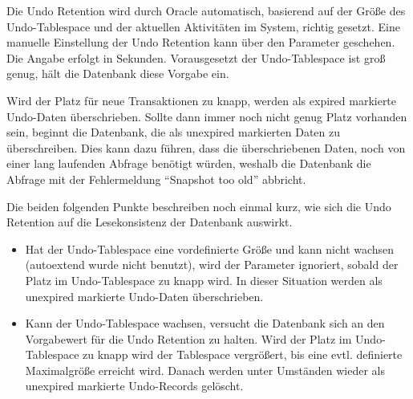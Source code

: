       Die Undo Retention wird durch Oracle automatisch, basierend auf der Größe des Undo-Tablespace und der aktuellen Aktivitäten im System, richtig gesetzt. Eine manuelle Einstellung der Undo Retention kann über den Parameter  geschehen. Die Angabe erfolgt in Sekunden. Vorausgesetzt der Undo-Tablespace ist groß genug, hält die Datenbank diese Vorgabe ein.

      Wird der Platz für neue Transaktionen zu knapp, werden als expired markierte Undo-Daten überschrieben. Sollte dann immer noch nicht genug Platz vorhanden sein, beginnt die Datenbank, die als unexpired markierten Daten zu überschreiben. Dies kann dazu führen, dass die überschriebenen Daten, noch von einer lang laufenden Abfrage benötigt würden, weshalb die Datenbank die Abfrage mit der Fehlermeldung \enquote{Snapshot too old} abbricht.

      Die beiden folgenden Punkte beschreiben noch einmal kurz, wie sich die Undo Retention auf die Lesekonsistenz der Datenbank auswirkt.
			\begin{itemize}
        \item Hat der Undo-Tablespace eine vordefinierte Größe und kann nicht wachsen (autoextend wurde nicht benutzt), wird der Parameter  ignoriert, sobald der Platz im Undo-Tablespace zu knapp wird. In dieser Situation werden als unexpired markierte Undo-Daten überschrieben.
        \item Kann der Undo-Tablespace wachsen, versucht die Datenbank sich an den Vorgabewert für die Undo Retention zu halten. Wird der Platz im Undo-Tablespace zu knapp wird der Tablespace vergrößert, bis eine evtl. definierte Maximalgröße erreicht wird. Danach werden unter Umständen wieder als unexpired markierte Undo-Records gelöscht.
      \end{itemize}
